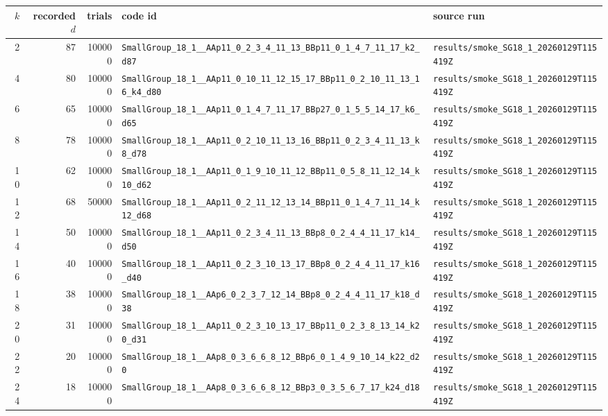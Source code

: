 \documentclass[11pt]{article}
\begin{document}
\begin{longtable}{@{}r r r l l@{}}
\toprule
$k$ & recorded $d$ & trials & code id & source run \\
\midrule
\endhead
2 & 87 & 100000 & \texttt{SmallGroup\_18\_1\_\_AAp11\_0\_2\_3\_4\_11\_13\_BBp11\_0\_1\_4\_7\_11\_17\_k2\_d87} & \texttt{results/smoke\_SG18\_1\_20260129T115419Z} \\
4 & 80 & 100000 & \texttt{SmallGroup\_18\_1\_\_AAp11\_0\_10\_11\_12\_15\_17\_BBp11\_0\_2\_10\_11\_13\_16\_k4\_d80} & \texttt{results/smoke\_SG18\_1\_20260129T115419Z} \\
6 & 65 & 100000 & \texttt{SmallGroup\_18\_1\_\_AAp11\_0\_1\_4\_7\_11\_17\_BBp27\_0\_1\_5\_5\_14\_17\_k6\_d65} & \texttt{results/smoke\_SG18\_1\_20260129T115419Z} \\
8 & 78 & 100000 & \texttt{SmallGroup\_18\_1\_\_AAp11\_0\_2\_10\_11\_13\_16\_BBp11\_0\_2\_3\_4\_11\_13\_k8\_d78} & \texttt{results/smoke\_SG18\_1\_20260129T115419Z} \\
10 & 62 & 100000 & \texttt{SmallGroup\_18\_1\_\_AAp11\_0\_1\_9\_10\_11\_12\_BBp11\_0\_5\_8\_11\_12\_14\_k10\_d62} & \texttt{results/smoke\_SG18\_1\_20260129T115419Z} \\
12 & 68 & 50000 & \texttt{SmallGroup\_18\_1\_\_AAp11\_0\_2\_11\_12\_13\_14\_BBp11\_0\_1\_4\_7\_11\_14\_k12\_d68} & \texttt{results/smoke\_SG18\_1\_20260129T115419Z} \\
14 & 50 & 100000 & \texttt{SmallGroup\_18\_1\_\_AAp11\_0\_2\_3\_4\_11\_13\_BBp8\_0\_2\_4\_4\_11\_17\_k14\_d50} & \texttt{results/smoke\_SG18\_1\_20260129T115419Z} \\
16 & 40 & 100000 & \texttt{SmallGroup\_18\_1\_\_AAp11\_0\_2\_3\_10\_13\_17\_BBp8\_0\_2\_4\_4\_11\_17\_k16\_d40} & \texttt{results/smoke\_SG18\_1\_20260129T115419Z} \\
18 & 38 & 100000 & \texttt{SmallGroup\_18\_1\_\_AAp6\_0\_2\_3\_7\_12\_14\_BBp8\_0\_2\_4\_4\_11\_17\_k18\_d38} & \texttt{results/smoke\_SG18\_1\_20260129T115419Z} \\
20 & 31 & 100000 & \texttt{SmallGroup\_18\_1\_\_AAp11\_0\_2\_3\_10\_13\_17\_BBp11\_0\_2\_3\_8\_13\_14\_k20\_d31} & \texttt{results/smoke\_SG18\_1\_20260129T115419Z} \\
22 & 20 & 100000 & \texttt{SmallGroup\_18\_1\_\_AAp8\_0\_3\_6\_6\_8\_12\_BBp6\_0\_1\_4\_9\_10\_14\_k22\_d20} & \texttt{results/smoke\_SG18\_1\_20260129T115419Z} \\
24 & 18 & 100000 & \texttt{SmallGroup\_18\_1\_\_AAp8\_0\_3\_6\_6\_8\_12\_BBp3\_0\_3\_5\_6\_7\_17\_k24\_d18} & \texttt{results/smoke\_SG18\_1\_20260129T115419Z} \\

\end{longtable}
\end{document}
